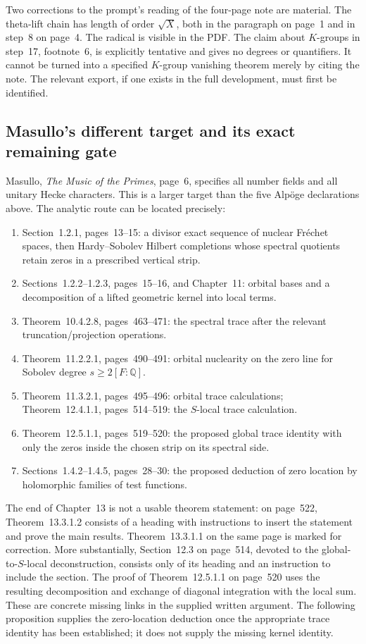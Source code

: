 Two corrections to the prompt's reading of the four-page note are material.
The theta-lift chain has length of order $\sqrt X$, both in the paragraph on
page~1 and in step~8 on page~4.  The radical is visible in the PDF.  The claim
about $K$-groups in step~17, footnote~6, is explicitly tentative and gives no
degrees or quantifiers.  It cannot be turned into a specified $K$-group
vanishing theorem merely by citing the note.  The relevant export, if one
exists in the full development, must first be identified.

\subsection{Masullo's different target and its exact remaining gate}

Masullo, \emph{The Music of the Primes}, page~6, specifies all number fields
and all unitary Hecke characters.  This is a larger target than the five
Alp\"oge declarations above.  The analytic route can be located precisely:
\begin{enumerate}
\item Section~1.2.1, pages~13--15: a divisor exact sequence of nuclear
Fr\'echet spaces, then Hardy--Sobolev Hilbert completions whose spectral
quotients retain zeros in a prescribed vertical strip.
\item Sections~1.2.2--1.2.3, pages~15--16, and Chapter~11: orbital bases
and a decomposition of a lifted geometric kernel into local terms.
\item Theorem~10.4.2.8, pages~463--471: the spectral trace after the
relevant truncation/projection operations.
\item Theorem~11.2.2.1, pages~490--491: orbital nuclearity on the
zero line for Sobolev degree $s\geq 2[F:\mathbb Q]$.
\item Theorem~11.3.2.1, pages~495--496: orbital trace calculations;
Theorem~12.4.1.1, pages~514--519: the $S$-local trace calculation.
\item Theorem~12.5.1.1, pages~519--520: the proposed global trace
identity with only the zeros inside the chosen strip on its spectral side.
\item Sections~1.4.2--1.4.5, pages~28--30: the proposed deduction of
zero location by holomorphic families of test functions.
\end{enumerate}
The end of Chapter~13 is not a usable theorem statement: on page~522,
Theorem~13.3.1.2 consists of a heading with instructions to insert the
statement and prove the main results.  Theorem~13.3.1.1 on the same page is
marked for correction.  More substantially, Section~12.3 on page~514, devoted
to the global-to-$S$-local deconstruction, consists only of its heading and an
instruction to include the section.  The proof of Theorem~12.5.1.1 on
page~520 uses the resulting decomposition and exchange of diagonal integration
with the local sum.  These are concrete missing links in the supplied written
argument.  The following proposition supplies the zero-location deduction
once the appropriate trace identity has been established; it does not supply
the missing kernel identity.

